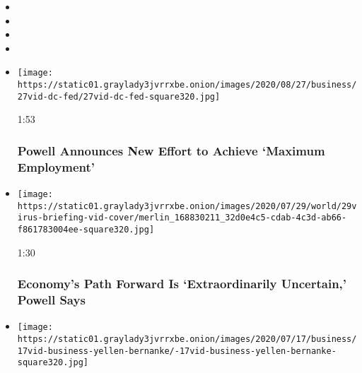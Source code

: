 \begin{itemize}
\item
\item
\item
\item
\end{itemize}

\begin{itemize}
\item
  \href{https://www.nytimes3xbfgragh.onion/video/us/politics/100000007310588/powell-review-central-banks-policy-tools-video.html?action=click\&module=video-series-bar\&region=header\&pgtype=Article\&playlistId=video/business}{}

  \texttt{[image: https://static01.graylady3jvrrxbe.onion/images/2020/08/27/business/27vid-dc-fed/27vid-dc-fed-square320.jpg]}

  1:53

  \hypertarget{powell-announces-new-effort-to-achieve-maximum-employment}{%
  \subsubsection{Powell Announces New Effort to Achieve `Maximum
  Employment'}\label{powell-announces-new-effort-to-achieve-maximum-employment}}
\item
  \href{https://www.nytimes3xbfgragh.onion/video/us/100000007262574/fed-powell-economy-coronavirus.html?action=click\&module=video-series-bar\&region=header\&pgtype=Article\&playlistId=video/business}{}

  \texttt{[image: https://static01.graylady3jvrrxbe.onion/images/2020/07/29/world/29virus-briefing-vid-cover/merlin\_168830211\_32d0e4c5-cdab-4c3d-ab66-f861783004ee-square320.jpg]}

  1:30

  \hypertarget{economys-path-forward-is-extraordinarily-uncertain-powell-says}{%
  \subsubsection{Economy's Path Forward Is `Extraordinarily Uncertain,'
  Powell
  Says}\label{economys-path-forward-is-extraordinarily-uncertain-powell-says}}
\item
  \href{https://www.nytimes3xbfgragh.onion/video/us/100000007245081/former-federal-reserve-chairs-push-for-more-economic-relief.html?action=click\&module=video-series-bar\&region=header\&pgtype=Article\&playlistId=video/business}{}

  \texttt{[image: https://static01.graylady3jvrrxbe.onion/images/2020/07/17/business/17vid-business-yellen-bernanke/-17vid-business-yellen-bernanke-square320.jpg]}


\end{itemize}
